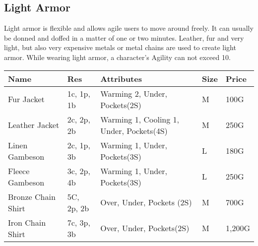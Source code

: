 \subsection{Light Armor}\label{subsec:lightArmor}
Light armor is flexible and allows agile users to move around freely.
It can usually be donned and doffed in a matter of one or two minutes.
Leather, fur and very light, but also very expensive metals or metal chains are used to create light armor.
While wearing light armor, a character's Agility can not exceed 10.

\begin{longtable}{p{3.5cm} | p{1.5cm} | p{5cm} | p{1cm} | p{1.25cm}}
	Name & Res &  Attributes & Size & Price\\ \hline
	Fur Jacket & 1c, 1p, 1b & Warming 2, Under, Pockets(2S) & M & 100G\\

	Leather Jacket & 2c, 2p, 2b & Warming 1, Cooling 1, Under, Pockets(4S)  & M & 250G\\

	Linen Gambeson & 2c, 1p, 3b & Warming 1, Under, Pockets(3S) & L & 180G\\

	Fleece Gambeson & 3c, 2p, 4b & Warming 1, Under, Pockets(3S) & L & 250G\\

	Bronze Chain Shirt & 5C, 2p, 2b & Over, Under, Pockets (2S) & M & 700G\\

	Iron Chain Shirt & 7c, 3p, 3b & Over, Under, Pockets(2S) & M & 1,200G\\
\end{longtable}